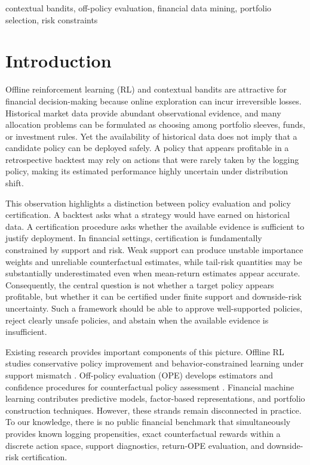 \documentclass[conference]{IEEEtran}
\begin{document}
\begin{IEEEkeywords}
contextual bandits, off-policy evaluation, financial data mining, portfolio selection, risk constraints
\end{IEEEkeywords}
\section{Introduction}

Offline reinforcement learning (RL) and contextual bandits are attractive for financial decision-making because online exploration can incur irreversible losses. Historical market data provide abundant observational evidence, and many allocation problems can be formulated as choosing among portfolio sleeves, funds, or investment rules. Yet the availability of historical data does not imply that a candidate policy can be deployed safely. A policy that appears profitable in a retrospective backtest may rely on actions that were rarely taken by the logging policy, making its estimated performance highly uncertain under distribution shift.

This observation highlights a distinction between policy evaluation and policy certification. A backtest asks what a strategy would have earned on historical data. A certification procedure asks whether the available evidence is sufficient to justify deployment. In financial settings, certification is fundamentally constrained by support and risk. Weak support can produce unstable importance weights and unreliable counterfactual estimates, while tail-risk quantities may be substantially underestimated even when mean-return estimates appear accurate. Consequently, the central question is not whether a target policy appears profitable, but whether it can be certified under finite support and downside-risk uncertainty. Such a framework should be able to approve well-supported policies, reject clearly unsafe policies, and abstain when the available evidence is insufficient.

Existing research provides important components of this picture. Offline RL studies conservative policy improvement and behavior-constrained learning under support mismatch \cite{FujimotoMP19,KumarFSTL19,KumarZTL20,YuTYEZLFM20,KidambiRNNJ20,KostrikovNT21,XieCJA21}. Off-policy evaluation (OPE) develops estimators and confidence procedures for counterfactual policy assessment \cite{ThomasTG15,DuanJW20,KallusU20,ChandakNLBT21,KallusMWZ22,XieYZ23}. Financial machine learning contributes predictive models, factor-based representations, and portfolio construction techniques. However, these strands remain disconnected in practice. To our knowledge, there is no public financial benchmark that simultaneously provides known logging propensities, exact counterfactual rewards within a discrete action space, support diagnostics, return-OPE evaluation, and downside-risk certification.
\end{document}
